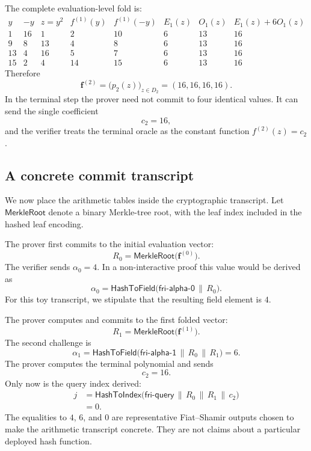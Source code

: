 The complete evaluation-level fold is:
\[
\begin{array}{c|c|c|c|c|c|c|c}
y & -y & z=y^2
& f^{(1)}(y) & f^{(1)}(-y)
& E_1(z) & O_1(z) & E_1(z)+6O_1(z)\\
\hline
1  &16&1 &2 &10&6&13&16\\
9  &8 &13&4 &8 &6&13&16\\
13 &4 &16&5 &7 &6&13&16\\
15 &2 &4 &14&15&6&13&16
\end{array}
\]
Therefore
\[
    \mathbf f^{(2)}
    =\bigl(p_2(z)\bigr)_{z\in D_2}
    =(16,16,16,16).
\]
In the terminal step the prover need not commit to four identical values. It can send the
single coefficient
\[
    c_2=16,
\]
and the verifier treats the terminal oracle as the constant function $f^{(2)}(z)=c_2$.

\subsection{A concrete commit transcript}

We now place the arithmetic tables inside the cryptographic transcript. Let
$\mathsf{MerkleRoot}$ denote a binary Merkle-tree root, with the leaf index included in the
hashed leaf encoding.

The prover first commits to the initial evaluation vector:
\[
    R_0=\mathsf{MerkleRoot}\bigl(\mathbf f^{(0)}\bigr).
\]
The verifier sends $\alpha_0=4$. In a non-interactive proof this value would be derived as
\[
    \alpha_0
    =\mathsf{HashToField}
      \bigl(\mathsf{fri\mbox{-}alpha\mbox{-}0}\,\|\,R_0\bigr).
\]
For this toy transcript, we stipulate that the resulting field element is $4$.

The prover computes and commits to the first folded vector:
\[
    R_1=\mathsf{MerkleRoot}\bigl(\mathbf f^{(1)}\bigr).
\]
The second challenge is
\[
    \alpha_1
    =\mathsf{HashToField}
      \bigl(\mathsf{fri\mbox{-}alpha\mbox{-}1}\,\|\,R_0\,\|\,R_1\bigr)
    =6.
\]
The prover computes the terminal polynomial and sends
\[
    c_2=16.
\]
Only now is the query index derived:
\[
\begin{aligned}
j
&=\mathsf{HashToIndex}
  \bigl(\mathsf{fri\mbox{-}query}\,\|\,R_0\,\|\,R_1\,\|\,c_2\bigr)\\
&=0.
\end{aligned}
\]
The equalities to $4$, $6$, and $0$ are representative Fiat--Shamir outputs chosen to make
the arithmetic transcript concrete. They are not claims about a particular deployed hash
function.

